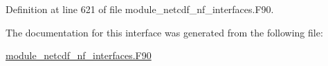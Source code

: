 Definition at line 621 of file module\+\_\+netcdf\+\_\+nf\+\_\+interfaces.\+F90.



The documentation for this interface was generated from the following file\+:\begin{DoxyCompactItemize}
\item 
\hyperlink{module__netcdf__nf__interfaces_8F90}{module\+\_\+netcdf\+\_\+nf\+\_\+interfaces.\+F90}\end{DoxyCompactItemize}
